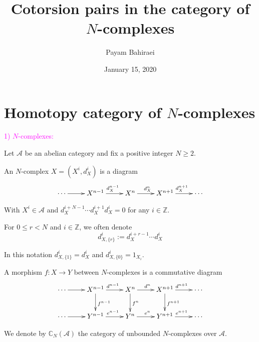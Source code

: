 \documentclass[t,ignorenonframetext]{beamer}
\title[Cotorsion pairs in the category of $N$-complexes]{Cotorsion pairs in the category of $N$-complexes}
\author[P. Bahiraei]{Payam Bahiraei}
\institute[IPM]{\\~ \\ University of Guilan and IPM\\~
 \\
}
\date[Jan. 15, 2020]{January 15, 2020}
\newcommand{\lrt}{\longrightarrow}
\newcommand{\CA}{\mathcal{A} }
\newcommand{\C}{\mathbb{C} }
\newcommand{\Z}{\mathbb{Z} }
\begin{document}
\frame{
\maketitle
}


\section{Homotopy category of $N$-complexes}
\begin{frame}{\textcolor{magenta}{1) $N$-complexes:}}

Let $\CA$ be an abelian category and fix a positive integer $N\geq 2$.


\pause
An $N$-complex $X=(X^i,d^i_X)$ is a diagram
\[ \xymatrix { \cdots \ar[r] & X^{n-1} \ar[r]^{d^{n-1}_X} & X^n \ar[r]^{d^{n}_X} & X^{n+1} \ar[r]^{d^{n+1}_X} & \cdots }\]

\pause
With $X^i\in \CA$ and $d^{i+N-1}_X \cdots d^{i+1}_X d^i_X=0$ for any $i\in \Z$.

\vspace{0.4cm}
\pause
For $0\leq r<N$ and $i\in \mathbb{Z}$, we often denote 
$$ d_{X,\lbrace r\rbrace}^{i}:=d_{X}^{i+r-1} \cdots d_{X}^{i} $$

\pause
In this notation $d_{X,\lbrace 1\rbrace}^i=d^i_{X}$ and $d_{X,\lbrace 0\rbrace}^i=1_{X_i}$.

\end{frame}



\begin{frame}
A morphism $f:X\lrt Y$ between $N$-complexes is a commutative diagram
\vspace{0.4cm}
\pause
\[ \xymatrix { \cdots \ar[r] & X^{n-1} \ar[r]^{d^{n-1}} \ar[d]^{f^{n-1}}& X^n \ar[r]^{d^{n}}\ar[d]^{f^{n}} & X^{n+1} \ar[r]^{d^{n+1}} \ar[d]^{f^{n+1}}& \cdots
\\ \cdots \ar[r] & Y^{n-1} \ar[r]^{e^{n-1}} & Y^n \ar[r]^{e^{n}} & Y^{n+1} \ar[r]^{e^{n+1}} & \cdots }\]

\pause
We denote by $\C_N(\CA)$ the category of unbounded $N$-complexes over $\CA$.
\end{frame}
\end{document}
